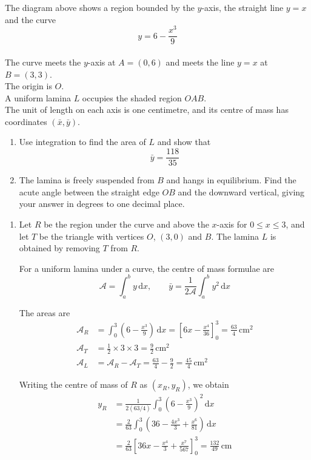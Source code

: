 \documentclass[leqno]{article}
\begin{document}
\begin{enumerate}[
  label=\textbf{\arabic*.},
  leftmargin=*,
  topsep=0pt,
  partopsep=0pt,
  parsep=0pt
]
The diagram above shows a region bounded by the $y$-axis, the straight line $y=x$ and the curve
\[
y=6-\dfrac{x^3}{9}
\] \\
The curve meets the $y$-axis at $A=(0,6)$ and meets the line $y=x$ at $B=(3,3)$. \\
The origin is $O$. \\

A uniform lamina $L$ occupies the shaded region $OAB$. \\
The unit of length on each axis is one centimetre, and its centre of mass has coordinates $(\bar{x},\bar{y})$. \\
\begin{enumerate}[label=\textbf{(\alph*)}]
\item Use integration to find the area of $L$ and show that
\[
\bar{y}=\dfrac{118}{35}
\] 
\item The lamina is freely suspended from $B$ and hangs in equilibrium. Find the acute angle between the straight edge $OB$ and the downward vertical, giving your answer in degrees to one decimal place.  \\
\end{enumerate}

\vspace*{10pt}

\begin{djsSolution}
\begin{enumerate}[label=\textbf{(\alph*)}, start=1]
\item
Let \(R\) be the region under the curve and above the \(x\)-axis for \(0\leq x\leq3\), and let \(T\) be the triangle with vertices \(O\), \((3,0)\) and \(B\). The lamina \(L\) is obtained by removing \(T\) from \(R\).

For a uniform lamina under a curve, the centre of mass formulae are
\[
\mathcal{A}=\int_a^b y\,\mathrm{d}x,
\qquad
\bar{y}=\frac{1}{2\mathcal{A}}\int_a^b y^2\,\mathrm{d}x
\]

The areas are
\begin{align*}
\mathcal{A}_R&=\int_0^3\left(6-\frac{x^3}{9}\right)\,\mathrm{d}x
=\left[6x-\frac{x^4}{36}\right]_0^3
=\frac{63}{4}\,\mathrm{cm^2}\\
\mathcal{A}_T&=\frac12\times3\times3=\frac92\,\mathrm{cm^2}\\
\mathcal{A}_L&=\mathcal{A}_R-\mathcal{A}_T=\frac{63}{4}-\frac92=\frac{45}{4}\,\mathrm{cm^2}
\end{align*}

Writing the centre of mass of \(R\) as \((x_R,y_R)\), we obtain
\begin{align*}
y_R
&=\frac{1}{2(63/4)}\int_0^3\left(6-\frac{x^3}{9}\right)^2\,\mathrm{d}x\\
&=\frac{2}{63}\int_0^3\left(36-\frac{4x^3}{3}+\frac{x^6}{81}\right)\,\mathrm{d}x\\
&=\frac{2}{63}\left[36x-\frac{x^4}{3}+\frac{x^7}{567}\right]_0^3
=\frac{132}{49}\,\mathrm{cm}
\end{align*}


\end{enumerate}
\end{djsSolution}
\end{enumerate}
\end{document}
